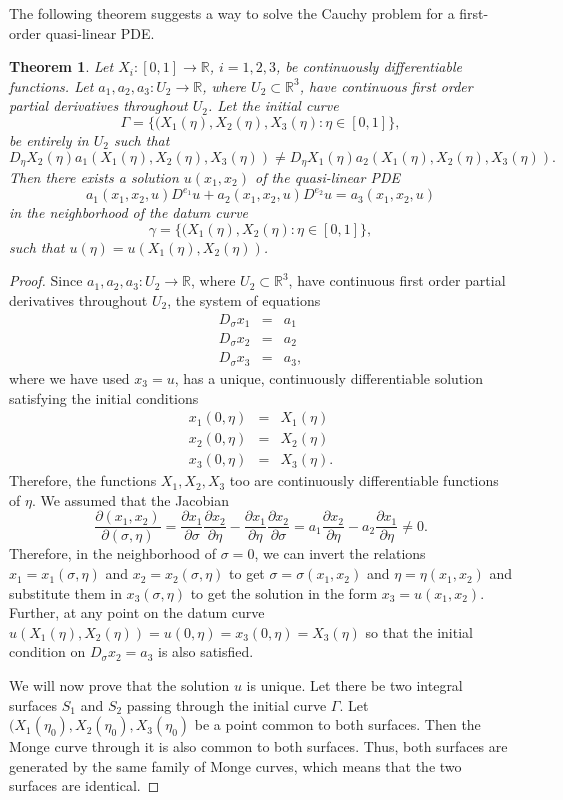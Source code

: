 \documentclass{article}
\newcommand{\pd}[2]{\frac{\partial{#1}}{\partial{#2}}}
\theoremstyle{plain}
\newtheorem{thm}{Theorem}
\numberwithin{thm}{section}
\theoremstyle{plain}
\numberwithin{prop}{section}
\theoremstyle{definition}
\numberwithin{defn}{section}
\theoremstyle{remark}
\numberwithin{equation}{section}
\begin{document}
The following theorem suggests a way to solve the Cauchy problem for a first-order quasi-linear PDE.
\begin{thm}\label{s4t3}
Let $X_i: [0, 1] \rightarrow \mathbb{R}$, $i = 1, 2, 3$, be continuously differentiable functions. 
Let $a_1, a_2, a_3: U_2 \rightarrow \mathbb{R}$, where $U_2 \subset \mathbb{R}^3$, have
continuous first order partial derivatives throughout $U_2$. Let the initial curve 
\[
\Gamma = \{(X_1(\eta), X_2(\eta), X_3(\eta): \eta \in [0, 1]\},
\]
be entirely in $U_2$ such that
\[
D_\eta X_2(\eta) a_1(X_1(\eta), X_2(\eta), X_3(\eta)) \ne 
D_\eta X_1(\eta) a_2(X_1(\eta), X_2(\eta), X_3(\eta)).
\]
Then there exists a solution $u(x_1, x_2)$ of the quasi-linear PDE
\[
a_1(x_1, x_2, u)D^{e_1}u + a_2(x_1, x_2, u)D^{e_2}u = a_3(x_1, x_2, u)
\]
in the neighborhood of the datum curve 
\[
\gamma = \{(X_1(\eta), X_2(\eta): \eta \in [0, 1]\},
\]
such that $u(\eta) = u(X_1(\eta), X_2(\eta))$.
\end{thm}
\begin{proof}
Since $a_1, a_2, a_3: U_2 \rightarrow \mathbb{R}$, where $U_2 \subset \mathbb{R}^3$, have
continuous first order partial derivatives throughout $U_2$, the system of equations
\begin{eqnarray*}
D_\sigma x_1 &=& a_1 \\
D_\sigma x_2 &=& a_2 \\
D_\sigma x_3 &=& a_3,
\end{eqnarray*}
where we have used $x_3 = u$, has a unique, continuously differentiable solution satisfying the
initial conditions
\begin{eqnarray*}
x_1(0, \eta) &=& X_1(\eta) \\
x_2(0, \eta) &=& X_2(\eta) \\
x_3(0, \eta) &=& X_3(\eta).
\end{eqnarray*}
Therefore, the functions $X_1, X_2, X_3$ too are continuously differentiable functions of $\eta$.
We assumed that the Jacobian
\[
\frac{\partial(x_1, x_2)}{\partial(\sigma, \eta)} = \pd{x_1}{\sigma}\pd{x_2}{\eta} - 
\pd{x_1}{\eta}\pd{x_2}{\sigma} = a_1\pd{x_2}{\eta} - a_2\pd{x_1}{\eta} \ne 0.
\]
Therefore, in the neighborhood of $\sigma = 0$, we can invert the relations $x_1 = x_1(\sigma, \eta)$
and $x_2 = x_2(\sigma, \eta)$ to get $\sigma = \sigma(x_1, x_2)$ and $\eta = \eta(x_1, x_2)$ and
substitute them in $x_3(\sigma, \eta)$ to get the solution in the form $x_3 = u(x_1, x_2)$. Further,
at any point on the datum curve $u(X_1(\eta), X_2(\eta)) = u(0, \eta) = x_3(0, \eta) = X_3(\eta)$
so that the initial condition on $D_\sigma x_2 = a_3$ is also satisfied.

We will now prove that the solution $u$ is unique. Let there be two integral surfaces $S_1$ and $S_2$
passing through the initial curve $\Gamma$. Let $(X_1(\eta_0), X_2(\eta_0), X_3(\eta_0)$ be a point 
common to both surfaces. Then the Monge curve through it is also common to both surfaces. Thus, both
surfaces are generated by the same family of Monge curves, which means that the two surfaces are 
identical.
\end{proof}
\end{document}

